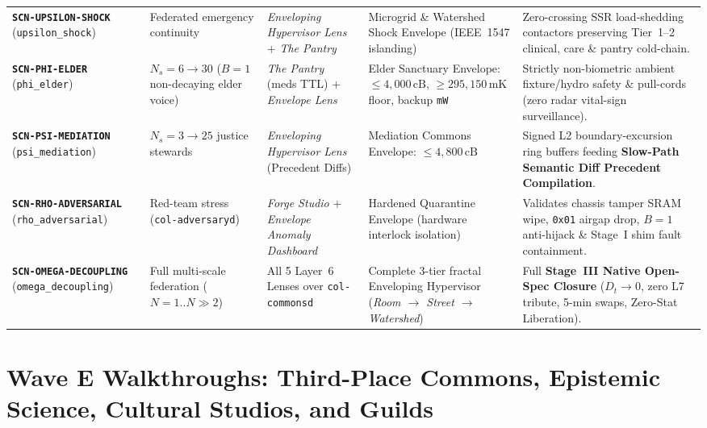 \begin{table}[htbp]
\begin{tabular}{@{}p{2.4cm}p{1.9cm}p{2.8cm}p{3.1cm}p{3.5cm}@{}}
\addlinespace[2pt]
\textbf{\texttt{SCN-UPSILON-SHOCK}} (\texttt{upsilon\_shock}) & Federated emergency continuity & \textit{Enveloping Hypervisor Lens} + \textit{The Pantry} & Microgrid \& Watershed Shock Envelope (IEEE~1547 islanding) & Zero-crossing SSR load-shedding contactors preserving Tier~1--2 clinical, care \& pantry cold-chain. \\
\addlinespace[2pt]
\textbf{\texttt{SCN-PHI-ELDER}} (\texttt{phi\_elder}) & $N_s = 6 \to 30$ ($B=1$ non-decaying elder voice) & \textit{The Pantry} (meds TTL) + \textit{Envelope Lens} & Elder Sanctuary Envelope: $\le 4{,}000\,\mathrm{cB}$, $\ge 295{,}150\,\mathrm{mK}$ floor, backup \texttt{mW} & Strictly non-biometric ambient fixture/hydro safety \& pull-cords (zero radar vital-sign surveillance). \\
\addlinespace[2pt]
\textbf{\texttt{SCN-PSI-MEDIATION}} (\texttt{psi\_mediation}) & $N_s = 3 \to 25$ justice stewards & \textit{Enveloping Hypervisor Lens} (Precedent Diffs) & Mediation Commons Envelope: $\le 4{,}800\,\mathrm{cB}$ & Signed L2 boundary-excursion ring buffers feeding \textbf{Slow-Path Semantic Diff Precedent Compilation}. \\
\addlinespace[2pt]
\textbf{\texttt{SCN-RHO-ADVERSARIAL}} (\texttt{rho\_adversarial}) & Red-team stress (\texttt{col-adversaryd}) & \textit{Forge Studio} + \textit{Envelope Anomaly Dashboard} & Hardened Quarantine Envelope (hardware interlock isolation) & Validates chassis tamper SRAM wipe, \texttt{0x01} airgap drop, $B=1$ anti-hijack \& Stage~I shim fault containment. \\
\addlinespace[2pt]
\textbf{\texttt{SCN-OMEGA-DECOUPLING}} (\texttt{omega\_decoupling}) & Full multi-scale federation ($N=1..N\gg 2$) & All 5 Layer~6 Lenses over \texttt{col-commonsd} & Complete 3-tier fractal Enveloping Hypervisor (\textit{Room $\to$ Street $\to$ Watershed}) & Full \textbf{Stage~III Native Open-Spec Closure} ($D_t \to 0$, zero L7 tribute, 5-min swaps, Zero-Stat Liberation). \\
\bottomrule
\end{tabular}
\end{table}

\section{Wave E Walkthroughs: Third-Place Commons, Epistemic Science, Cultural Studios, and Guilds}
\label{sec:l2-wave-e-walkthroughs}

